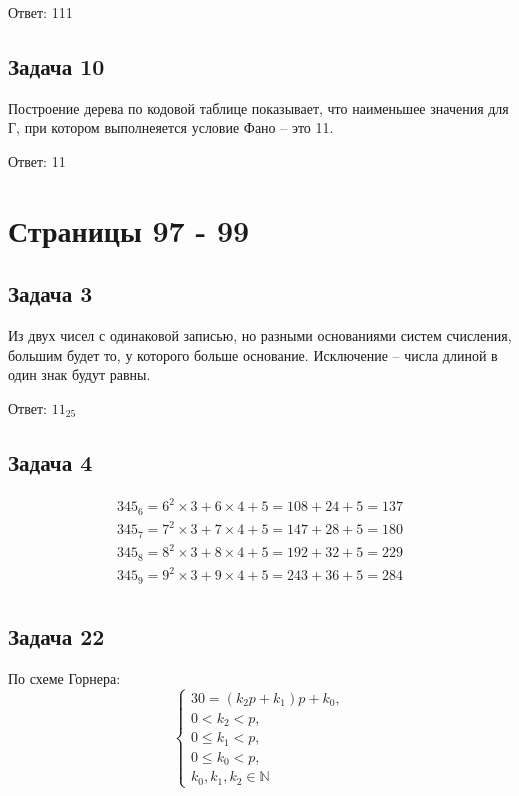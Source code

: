 \documentclass[12pt, a4paper]{article}
\begin{document}
  Ответ: 111

  \subsection{Задача 10}
  Построение дерева по кодовой таблице показывает, что наименьшее значения для Г,
  при котором выполнеяется условие Фано -- это 11.

  Ответ: 11

  \section{Страницы 97 - 99}
  \subsection{Задача 3}
  Из двух чисел с одинаковой записью, но разными основаниями систем счисления,
  большим будет то, у которого больше основание. Исключение -- числа длиной в 
  один знак будут равны.

  Ответ: $ 11_{25} $

  \subsection{Задача 4}
  \begin{equation*}
    \begin{gathered}
      345_{6} = 6^2 \times 3 + 6 \times 4 + 5 = 108 + 24 + 5 = 137 \\
      345_{7} = 7^2 \times 3 + 7 \times 4 + 5 = 147 + 28 + 5 = 180 \\
      345_{8} = 8^2 \times 3 + 8 \times 4 + 5 = 192 + 32 + 5 = 229 \\
      345_{9} = 9^2 \times 3 + 9 \times 4 + 5 = 243 + 36 + 5 = 284 \\
    \end{gathered}
  \end{equation*}

  \subsection{Задача 22}
  По схеме Горнера:
  \begin{equation}
    \label{eq:22gorner}
    \begin{cases}
      30 = (k_2p + k_1) p + k_0, \\
      0 < k_2 < p, \\
      0 \le k_1 < p, \\
      0 \le k_0 < p, \\
      k_0, k_1, k_2 \in \mathbb N 
    \end{cases}
  \end{equation}
 
\end{document}
